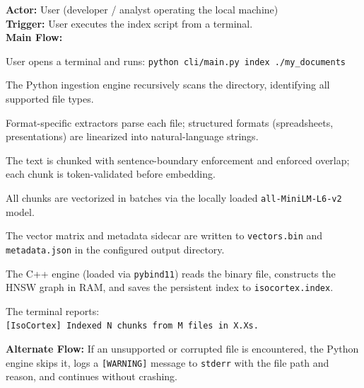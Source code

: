 \documentclass[12pt, a4paper]{article}
\begin{document}
\begin{tcolorbox}[enhanced, colback=white, colframe=ctPurple,
    colbacktitle=ctLightPurple, coltitle=ctPurple, boxrule=0.5pt,
    leftrule=4pt, arc=2mm, fonttitle=\large\bfseries,
    title={UC-1: Indexing a Local Directory},
    drop fuzzy shadow=black!5!white, top=2pt, bottom=2pt]
\textbf{Actor:} User (developer / analyst operating the local machine) \\[4pt]
\textbf{Trigger:} User executes the index script from a terminal. \\[4pt]
\textbf{Main Flow:}
\begin{trellolist}
    \item User opens a terminal and runs:
    \texttt{python cli/main.py index ./my\_documents}
    \item The Python ingestion engine recursively scans the directory,
    identifying all supported file types.
    \item Format-specific extractors parse each file; structured formats
    (spreadsheets, presentations) are linearized into natural-language
    strings.
    \item The text is chunked with sentence-boundary enforcement and
    enforced overlap; each chunk is token-validated before embedding.
    \item All chunks are vectorized in batches via the locally loaded
    \texttt{all-MiniLM-L6-v2} model.
    \item The vector matrix and metadata sidecar are written to
    \texttt{vectors.bin} and \texttt{metadata.json} in the configured
    output directory.
    \item The C++ engine (loaded via \texttt{pybind11}) reads the binary
    file, constructs the HNSW graph in RAM, and saves the persistent index
    to \texttt{isocortex.index}.
    \item The terminal reports:\\
    \texttt{[IsoCortex] Indexed N chunks from M files in X.Xs.}
\end{trellolist}
\textbf{Alternate Flow:} If an unsupported or corrupted file is
encountered, the Python engine skips it, logs a \texttt{[WARNING]} message
to \texttt{stderr} with the file path and reason, and continues without
crashing.
\end{tcolorbox}

\vspace{0.4cm}
\end{document}
